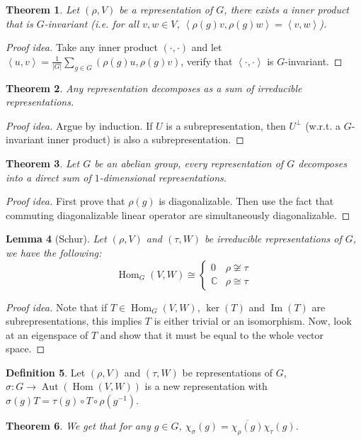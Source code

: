 \documentclass[paper=a4, fontsize=12pt]{scrartcl} %
\newtheorem{thm}{Theorem}[section]
\newtheorem{lem}[thm]{Lemma}
\theoremstyle{definition}
\newtheorem{defn}[thm]{Definition}
\theoremstyle{remark}
\DeclareMathOperator{\aut}{Aut}
\DeclareMathOperator{\im}{Im}
\DeclareMathOperator{\homm}{Hom}
\newcommand{\inp}[2]{\left\langle #1, #2 \right\rangle}
\numberwithin{equation}{section} %
\numberwithin{figure}{section} %
\numberwithin{table}{section} %
\begin{document}
\begin{thm}
	Let $(\rho, V)$ be a representation of $G$, there exists a inner product that is $G$-invariant (i.e. for all $v,w \in V$, $\inp{\rho(g)v}{\rho(g) w} = \inp{v}{w}$).
\end{thm}
\begin{proof}[Proof idea]
	Take any inner product $(\cdot, \cdot)$ and let $\inp{u}{v} = \frac{1}{|G|}\sum_{g \in G}(\rho(g)u, \rho(g)v)$, verify that $\inp{\cdot}{\cdot}$ is $G$-invariant.
\end{proof}
\begin{thm}
	Any representation decomposes as a sum of irreducible representations.
\end{thm}
\begin{proof}[Proof idea]
	Argue by induction. If $U$ is a subrepresentation, then $U^{\perp}$ (w.r.t. a $G$-invariant inner product) is also a subrepresentation.
\end{proof}
\begin{thm}
	Let $G$ be an abelian group, every representation of $G$ decomposes into a direct sum of $1$-dimensional representations.
\end{thm}
\begin{proof}[Proof idea]
	First prove that $\rho(g)$ is diagonalizable. Then use the fact that commuting diagonalizable linear operator are simultaneously diagonalizable.
\end{proof}
\begin{lem}[Schur]
	Let $(\rho, V)$ and $(\tau, W)$ be irreducible representations of $G$, we have the following: \[\homm_G(V,W) \cong \begin{cases}0 & \rho \not\cong \tau\\ \mathbb{C} & \rho \cong \tau \end{cases}\]
\end{lem}
\begin{proof}[Proof idea]
	Note that if $T \in \homm_G(V,W)$, $\ker(T)$ and $\im(T)$ are subrepresentations, this implies $T$ is either trivial or an isomorphism. Now, look at an eigenspace of $T$ and show that it must be equal to the whole vector space.
\end{proof}
\begin{defn}
	Let $(\rho, V)$ and $(\tau, W)$ be representations of $G$, $\sigma : G \rightarrow \aut(\homm(V,W))$ is a new representation with $\sigma(g) T = \tau(g) \circ T \circ \rho(g^{-1})$.
\end{defn}
\begin{thm}
	 We get that for any $g \in G$, $\chi_{\sigma}(g) = \overline{\chi_{\rho}(g)}\chi_{\tau}(g)$.
\end{thm}
\end{document}
